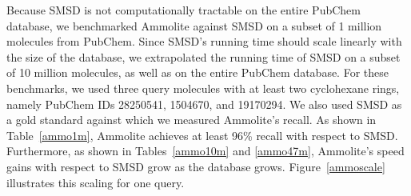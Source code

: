 \documentclass[review,preprint,12pt]{elsarticle}
\theoremstyle{definition}
\theoremstyle{remark}
\numberwithin{equation}{section}
\begin{document}
Because SMSD is not computationally tractable on the entire PubChem database,
we benchmarked Ammolite against SMSD on a subset of 1 million molecules from PubChem.
Since SMSD's running time should scale linearly with the size of the database, we extrapolated the
running time of SMSD on a subset of 10 million molecules, as well as on the entire PubChem database.
For these benchmarks, we used three query molecules with at least two cyclohexane rings, namely PubChem IDs 28250541, 1504670, and 19170294.
We also used SMSD as a gold standard against which we measured Ammolite's recall.
As shown in Table~\ref{ammo1m}, Ammolite achieves at least 96\% recall with respect to SMSD.
Furthermore, as shown in Tables~\ref{ammo10m} and \ref{ammo47m}, Ammolite's speed gains with respect to SMSD grow as the database grows.
Figure~\ref{ammoscale} illustrates this scaling for one query.
\end{document}
